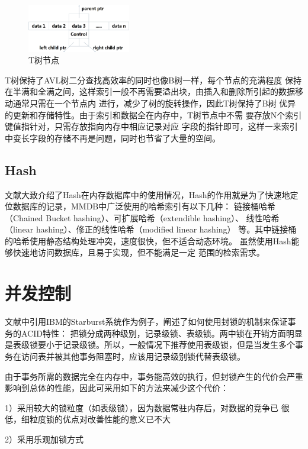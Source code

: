 \documentclass[literaturereview]{zjutreport}
\begin{document}
\begin{figure}[htbp]
\centering
\includegraphics[width=0.4\textwidth]{treenode}
\caption{T树节点}\label{fig:treenode}
\vspace{\baselineskip}
\end{figure}

T树保持了AVL树二分查找高效率的同时也像B树一样，每个节点的充满程度
保持在半满和全满之间，这样索引一般不再需要溢出块，由插入和删除所引起的数据移动通常只需在一个节点内
进行，减少了树的旋转操作，因此T树保持了B树
优异的更新和存储特性。由于索引和数据全在内存中，T树节点中不需
要存放N个索引键值指针对，只需存放指向内存中相应记录对应
字段的指针即可，这样一来索引中变长字段的存储不再是问题，同时也节省了大量的空间。

\subsection{Hash}
文献\cite{hash2007}大致介绍了Hash在内存数据库中的使用情况，Hash的作用就是为了快速地定位数据库的记录，MMDB中广泛使用的哈希索引有以下几种：
链接桶哈希（Chained Bucket hashing）、可扩展哈希（extendible hashing）、
线性哈希（linear hashing）、修正的线性哈希（modified linear hashing）
等。其中链接桶的哈希使用静态结构处理冲突，速度很快，但不适合动态环境。
虽然使用Hash能够快速地访问数据库，且易于实现，但不能满足一定
范围的检索需求。

\section{并发控制}
文献\cite{wangshan2007}中引用IBM的Starburst系统作为例子，阐述了如何使用封锁的机制来保证事务的ACID特性：
把锁分成两种级别，记录级锁、表级锁。两中锁在开销方面明显是表级锁要小于记录级锁。所以，一般情况下推荐使用表级锁，但是当发生多个事务在访问表并被其他事务阻塞时，应该用记录级别锁代替表级锁。

由于事务所需的数据完全在内存中，事务能高效的执行，但封锁产生的代价会严重影响到总体的性能，因此可采用如下的方法来减少这个代价：

1）采用较大的锁粒度（如表级锁），因为数据常驻内存后，对数据的竞争已
很低，细粒度锁的优点对改善性能的意义已不大

2）采用乐观加锁方式
\end{document}
